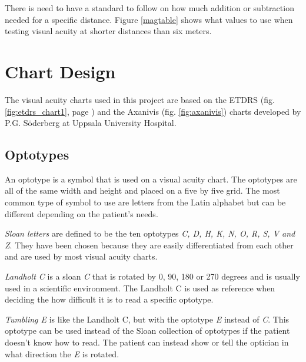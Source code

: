 \documentclass[12pt,a4paper,notitlepage]{report}
\begin{document}
There is need to have a standard to follow on how much addition or subtraction needed for a specific distance. Figure \ref{magtable} shows what values to use when testing visual acuity at shorter distances than six meters. \cite{PGSoderbergOral}

\section{Chart Design}
The visual acuity charts used in this project are based on the ETDRS (fig. \ref{fig:etdrs_chart1}, page \pageref{fig:etdrs_chart1}) \cite{Ferris} and the Axanivis (fig. \ref{fig:axanivis}) \cite{PGSoderbergOral} charts developed by P.G. Söderberg at Uppsala University Hospital. 


\subsection{Optotypes} \label{Optotypes}
An optotype is a symbol that is used on a visual acuity chart. The optotypes are all of the same width and height and placed on a five by five grid. The most common type of symbol to use are letters from the Latin alphabet but can be different depending on the patient's needs\cite{Colenbrander}.

\textit{Sloan letters} are defined to be the ten optotypes \textit{C, D, H, K, N, O, R, S, V and Z}. They have been chosen because they are easily differentiated from each other \cite{Ferris} and are used by most visual acuity charts\cite{Colenbrander}.

\textit{Landholt C} is a sloan \textit{C} that is rotated by 0, 90, 180 or 270 degrees and is usually used in a scientific environment. The Landholt C is used as reference when deciding the how difficult it is to read a specific optotype\cite{Colenbrander}.

\textit{Tumbling E} is like the Landholt C, but with the optotype \textit{E} instead of \textit{C}. This optotype can be used instead of the Sloan collection of optotypes if the patient doesn't know how to read. The patient can instead show or tell the optician in what direction the \textit{E} is rotated\cite{Colenbrander}.
\end{document}
